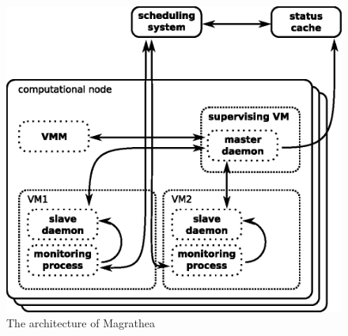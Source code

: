\documentclass{sig-alternate}
\begin{document}
\begin{figure}[tb]
    \includegraphics[width=\columnwidth]{architecture}
    \caption{The architecture of Magrathea}
    \label{fig:architecture}
\end{figure}
\end{document}
